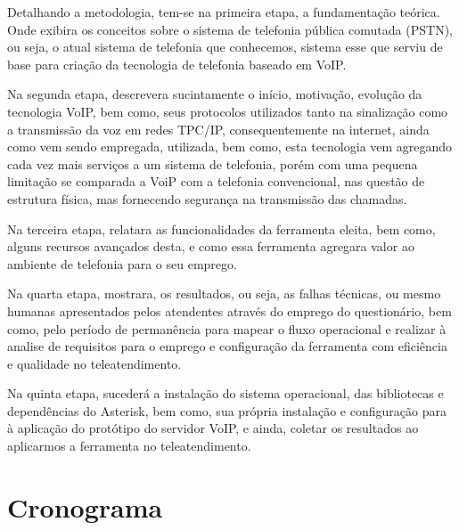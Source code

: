 Detalhando a metodologia, tem-se na primeira etapa, a fundamentação teórica. Onde exibira os conceitos sobre o sistema de telefonia pública comutada (PSTN), ou seja, o atual sistema de telefonia que conhecemos, sistema esse que serviu de base para criação da tecnologia de telefonia baseado em VoIP.

	Na segunda etapa, descrevera sucintamente o início, motivação, evolução da tecnologia VoIP, bem como, seus protocolos utilizados tanto na sinalização como a transmissão da voz em redes TPC/IP, consequentemente na internet, ainda como vem sendo empregada, utilizada, bem como, esta tecnologia vem agregando cada vez mais serviços a um sistema de telefonia, porém com uma pequena limitação se comparada a VoiP com a telefonia convencional, nas questão de estrutura física, mas fornecendo segurança na transmissão das chamadas.

	Na  terceira etapa, relatara as funcionalidades da ferramenta eleita, bem como, alguns recursos avançados desta, e como essa ferramenta agregara valor ao ambiente de telefonia para o seu emprego.

	Na quarta etapa, mostrara, os resultados, ou seja, as falhas técnicas, ou mesmo humanas apresentados pelos atendentes através do emprego do questionário, bem como, pelo período de permanência para mapear o fluxo operacional e realizar à analise de requisitos para o emprego e configuração da ferramenta com eficiência e qualidade no teleatendimento.

	Na quinta etapa, sucederá a instalação do sistema operacional, das bibliotecas e dependências do Asterisk, bem como, sua própria instalação e configuração para à aplicação do protótipo do servidor VoIP, e ainda, coletar os resultados ao aplicarmos a ferramenta no teleatendimento.


\newpage
\section{Cronograma}
\thispagestyle{empty}

